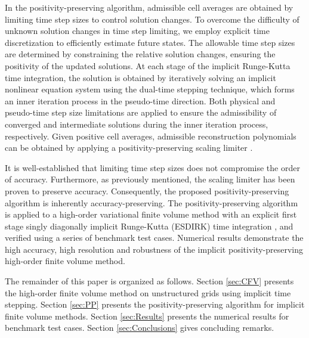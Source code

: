 {In the positivity-preserving algorithm, admissible cell averages are obtained by limiting time step sizes to control solution changes. To overcome the difficulty of unknown solution changes in time step limiting, we employ explicit time discretization to efficiently estimate future states. 
The allowable time step sizes are determined by constraining the relative solution changes, ensuring the positivity of the updated solutions. At each stage of the implicit Runge-Kutta time integration, the solution is obtained by iteratively solving an implicit nonlinear equation system using the dual-time stepping technique, which forms an inner iteration process in the pseudo-time direction. Both physical and pseudo-time step size limitations are applied to ensure the admissibility of converged and intermediate solutions during the inner iteration process, respectively.
Given positive cell averages, admissible reconstruction polynomials can be obtained by applying a positivity-preserving scaling limiter \cite{zhang2010positivity}.} 

It is well-established that limiting time step sizes does not compromise the order of accuracy. Furthermore, as previously mentioned, the scaling limiter has been proven to preserve accuracy. Consequently, the proposed positivity-preserving algorithm is inherently accuracy-preserving. 
The positivity-preserving algorithm is applied to a high-order variational finite volume method \cite{wang2017compact_VR} with an explicit first stage singly diagonally implicit Runge-Kutta (ESDIRK) time integration \cite{bijl2002implicitBDFvESDIRK}, and verified using a series of benchmark test cases. Numerical results demonstrate the high accuracy, high resolution and robustness of the implicit positivity-preserving high-order finite volume method.

The remainder of this paper is organized as follows. Section \ref{sec:CFV} presents the high-order finite volume method on unstructured grids using implicit time stepping. Section \ref{sec:PP} presents the positivity-preserving algorithm for implicit finite volume methods.
Section \ref{sec:Results} presents the numerical results for benchmark test cases. Section \ref{sec:Conclusions} gives concluding remarks.
